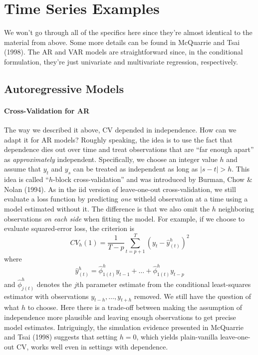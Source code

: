 \documentclass[12pt]{article}
\theoremstyle{definition}
\begin{document}
\section{Time Series Examples}
We won't go through all of the specifics here since they're almost identical to the material from above. Some more details can be found in
McQuarrie and Tsai (1998). The AR and VAR models are straightforward since, in the conditional formulation, they're just univariate and multivariate regression, respectively.

\subsection{Autoregressive Models}

\paragraph{Cross-Validation for AR}
The way we described it above, CV depended in independence. How can we adapt it for AR models? Roughly speaking, the idea is to use the fact that dependence dies out over time and treat observations that are ``far enough apart'' as \emph{approximately} independent. Specifically, we choose an integer value $h$ and assume that $y_t$ and $y_s$ can be treated as independent as long as $|s - t|>h$. This idea is called ``$h$-block cross-validation'' and was introduced by Burman, Chow \& Nolan (1994). As in the iid version of leave-one-out cross-validation, we still evaluate a loss function by predicting \emph{one} witheld observation at a time using a model estimated without it. The difference is that we also omit the $h$ neighboring observations \emph{on each side} when fitting the model. For example, if we choose to evaluate squared-error loss, the criterion is
	$$CV_h(1) = \frac{1}{T-p}\sum_{t = p+1}^T \left(y_t - \hat{y}_{(t)}^h\right)^2$$
where 
$$\hat{y}^h_{(t)} = \hat{\phi}^h_{1(t)} y_{t-1} + \hdots + \hat{\phi}^h_{1(t)}y_{t-p}$$
and $\hat{\phi}^h_{j(t)}$ denotes the $j$th parameter estimate from the conditional least-squares estimator with observations $y_{t-h}, \hdots,  y_{t+h}$ removed. We still have the question of what $h$ to choose. Here there is a trade-off between making the assumption of independence more plausible and leaving enough observations to get precise model estimates. Intriguingly, the simulation evidence presented in McQuarrie and Tsai (1998) suggests that setting $h=0$, which yields plain-vanilla leave-one-out CV, works well even in settings with dependence.
\end{document}
